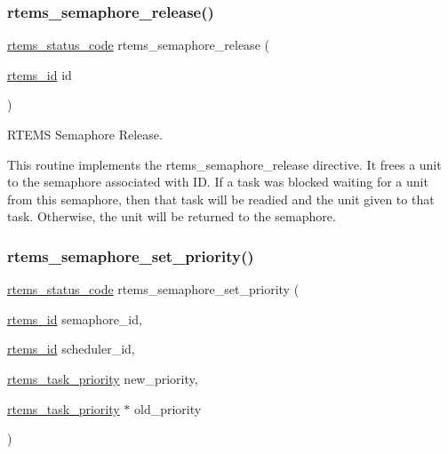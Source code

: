 \subsubsection{\texorpdfstring{rtems\_semaphore\_release()}{rtems\_semaphore\_release()}}
{\footnotesize\ttfamily \mbox{\hyperlink{group__ClassicStatus_ga545d41846817eaba6143d52ee4d9e9fe}{rtems\+\_\+status\+\_\+code}} rtems\+\_\+semaphore\+\_\+release (\begin{DoxyParamCaption}\item[{\mbox{\hyperlink{group__ClassicTasks_gab20892b814dced7dd4e5b9bf42becd57}{rtems\+\_\+id}}}]{id }\end{DoxyParamCaption})}



R\+T\+E\+MS Semaphore Release. 

This routine implements the rtems\+\_\+semaphore\+\_\+release directive. It frees a unit to the semaphore associated with ID. If a task was blocked waiting for a unit from this semaphore, then that task will be readied and the unit given to that task. Otherwise, the unit will be returned to the semaphore. \mbox{\label{group__ClassicSem_gad9bd7dcfb6e233a152f02f47bbf73f50}} 
\subsubsection{\texorpdfstring{rtems\_semaphore\_set\_priority()}{rtems\_semaphore\_set\_priority()}}
{\footnotesize\ttfamily \mbox{\hyperlink{group__ClassicStatus_ga545d41846817eaba6143d52ee4d9e9fe}{rtems\+\_\+status\+\_\+code}} rtems\+\_\+semaphore\+\_\+set\+\_\+priority (\begin{DoxyParamCaption}\item[{\mbox{\hyperlink{group__ClassicTasks_gab20892b814dced7dd4e5b9bf42becd57}{rtems\+\_\+id}}}]{semaphore\+\_\+id,  }\item[{\mbox{\hyperlink{group__ClassicTasks_gab20892b814dced7dd4e5b9bf42becd57}{rtems\+\_\+id}}}]{scheduler\+\_\+id,  }\item[{\mbox{\hyperlink{group__ClassicTasks_gaa80a0c0938307d1e99d0eb5fee765b47}{rtems\+\_\+task\+\_\+priority}}}]{new\+\_\+priority,  }\item[{\mbox{\hyperlink{group__ClassicTasks_gaa80a0c0938307d1e99d0eb5fee765b47}{rtems\+\_\+task\+\_\+priority}} $\ast$}]{old\+\_\+priority }\end{DoxyParamCaption})}



